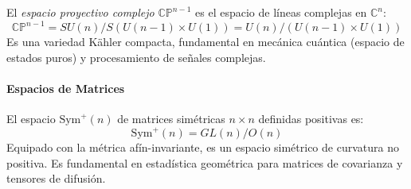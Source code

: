 \begin{definition}\label{def:cp_homogeneo}
El \textit{espacio proyectivo complejo} $\mathbb{CP}^{n-1}$ es el espacio de líneas complejas en $\mathbb{C}^n$:
\begin{equation}
\mathbb{CP}^{n-1} = SU(n)/S(U(n-1) \times U(1)) = U(n)/(U(n-1) \times U(1))
\end{equation}
Es una variedad Kähler compacta, fundamental en mecánica cuántica (espacio de estados puros) y procesamiento de señales complejas.
\end{definition}

\paragraph{Espacios de Matrices}

\begin{definition}\label{def:spd_homogeneo}
El espacio $\mathrm{Sym}^+(n)$ de matrices simétricas $n \times n$ definidas positivas es:
\begin{equation}
\mathrm{Sym}^+(n) = GL(n)/O(n)
\end{equation}
Equipado con la métrica afín-invariante, es un espacio simétrico de curvatura no positiva. Es fundamental en estadística geométrica para matrices de covarianza y tensores de difusión.
\end{definition}

